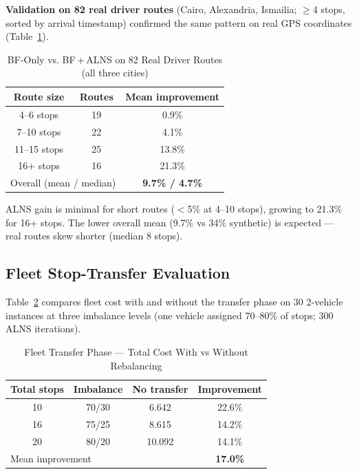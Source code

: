 \documentclass[conference]{IEEEtran}
\begin{document}
\textbf{Validation on 82 real driver routes} (Cairo, Alexandria, Ismailia;
$\geq$4 stops, sorted by arrival timestamp) confirmed the same pattern on real
GPS coordinates (Table~\ref{tab:ablation_real}).

\begin{table}[H]
\centering
\caption{BF-Only vs. BF\,+\,ALNS on 82 Real Driver Routes (all three cities)}
\label{tab:ablation_real}
\begin{tabular}{|c|c|c|}
\hline
\textbf{Route size} & \textbf{Routes} & \textbf{Mean improvement} \\ \hline
4--6 stops   & 19 &  0.9\% \\ \hline
7--10 stops  & 22 &  4.1\% \\ \hline
11--15 stops & 25 & 13.8\% \\ \hline
16+ stops    & 16 & 21.3\% \\ \hline
\multicolumn{2}{|l|}{Overall (mean / median)} & \textbf{9.7\% / 4.7\%} \\ \hline
\end{tabular}
\end{table}

ALNS gain is minimal for short routes ($<$5\% at 4--10 stops), growing to
21.3\% for 16+ stops. The lower overall mean (9.7\% vs 34\% synthetic) is
expected — real routes skew shorter (median 8 stops).

\subsection{Fleet Stop-Transfer Evaluation}

Table~\ref{tab:ablation_fleet} compares fleet cost with and without the
transfer phase on 30 2-vehicle instances at three imbalance levels (one vehicle
assigned 70--80\% of stops; 300 ALNS iterations).

\begin{table}[H]
\centering
\caption{Fleet Transfer Phase — Total Cost With vs Without Rebalancing}
\label{tab:ablation_fleet}
\begin{tabular}{|c|c|c|c|}
\hline
\textbf{Total stops} & \textbf{Imbalance} & \textbf{No transfer} & \textbf{Improvement} \\ \hline
10 & 70/30 &  6.642 & 22.6\% \\ \hline
16 & 75/25 &  8.615 & 14.2\% \\ \hline
20 & 80/20 & 10.092 & 14.1\% \\ \hline
\multicolumn{3}{|l|}{Mean improvement} & \textbf{17.0\%} \\ \hline
\end{tabular}
\end{table}
\end{document}
